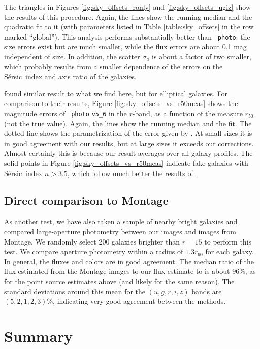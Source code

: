\documentclass[10pt,preprint]{aastex}
\newcommand{\Sersic}{S\'ersic}
\begin{document}
The triangles in Figures \ref{fig:sky_offsets_ronly} and
\ref{fig:sky_offsets_ugiz} show the results of this procedure. Again,
the lines show the running median and the quadratic fit to it (with
parameters listed in Table \ref{table:sky_offsets} in the row marked
``global''). This analysis performs substantially better than {\tt
  photo}: the size errors exist but are much smaller, while the flux
errors are about 0.1 mag independent of size. In addition, the scatter
$\sigma_a$ is about a factor of two smaller, which probably results
from a smaller dependence of the errors on the \Sersic\ index and axis
ratio of the galaxies.

\citet{hyde09a} found similar result to what we find here, but for
elliptical galaxies. For comparison to their results, Figure
\ref{fig:sky_offsets_vs_r50meas} shows the magnitude errors of {\tt
  photo} {\tt v5\_6} in the $r$-band, as a function of the measure
$r_{50}$ (not the true value).  Again, the lines show the running
median and the fit. The dotted line shows the parametrization of the
error given by \citet{hyde09a}. At small sizes it is in good agreement
with our results, but at large sizes it exceeds our corrections.
Almost certainly this is because our result averages over all galaxy
profiles. The solid points in Figure \ref{fig:sky_offsets_vs_r50meas}
indicate fake galaxies with \Sersic\ index $n>3.5$, which follow much
better the results of \citet{hyde09a}.

\subsection{Direct comparison to Montage}
\label{sec:galmontage}

As another test, we have also taken a sample of nearby bright galaxies
and compared large-aperture photometry between our images and images
from Montage. We randomly select 200 galaxies brighter than $r=15$ to
perform this test. We compare aperture photometry within a radius of
$1.3 r_{90}$ for each galaxy. In general, the fluxes and colors are in
good agreement. The median ratio of the flux estimated from the
Montage images to our flux estimate to is about 96\%, as for the point
source estimates above (and likely for the same reason). The standard
deviations around this mean for the $(u,g,r,i,z)$ bands are
$(5,2,1,2,3)\%$, indicating very good agreement between the methods.

\section{ Summary}
\end{document}
